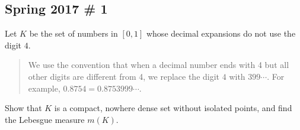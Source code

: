\hypertarget{spring-2017-1}{%
\subsection{Spring 2017 \# 1}\label{spring-2017-1}}

Let \(K\) be the set of numbers in \([0, 1]\) whose decimal expansions
do not use the digit \(4\).

\begin{quote}
We use the convention that when a decimal number ends with 4 but all
other digits are different from 4, we replace the digit \(4\) with
\(399\cdots\). For example, \(0.8754 = 0.8753999\cdots\).
\end{quote}

Show that \(K\) is a compact, nowhere dense set without isolated points,
and find the Lebesgue measure \(m(K)\).

